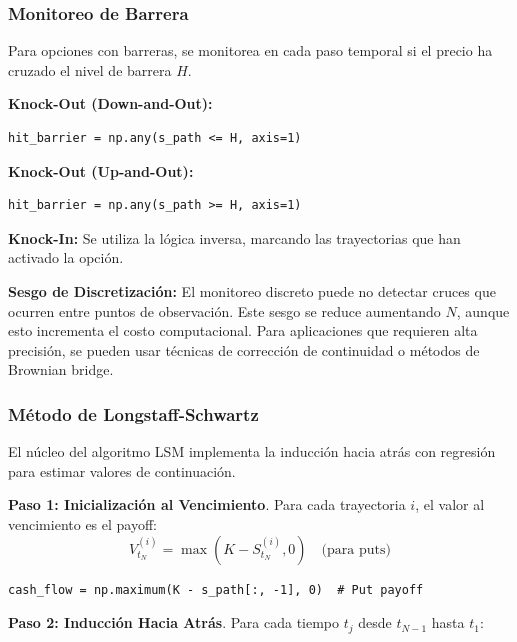 \subsubsection{Monitoreo de Barrera}

Para opciones con barreras, se monitorea en cada paso temporal si el precio ha cruzado el nivel de barrera $H$.

\textbf{Knock-Out (Down-and-Out):}
\begin{verbatim}
hit_barrier = np.any(s_path <= H, axis=1)
\end{verbatim}

\textbf{Knock-Out (Up-and-Out):}
\begin{verbatim}
hit_barrier = np.any(s_path >= H, axis=1)
\end{verbatim}

\textbf{Knock-In:} Se utiliza la lógica inversa, marcando las trayectorias que han activado la opción.

\textbf{Sesgo de Discretización:} El monitoreo discreto puede no detectar cruces que ocurren entre puntos de observación. Este sesgo se reduce aumentando $N$, aunque esto incrementa el costo computacional. Para aplicaciones que requieren alta precisión, se pueden usar técnicas de corrección de continuidad o métodos de Brownian bridge.

\subsubsection{Método de Longstaff-Schwartz}

El núcleo del algoritmo LSM implementa la inducción hacia atrás con regresión para estimar valores de continuación.

\textbf{Paso 1: Inicialización al Vencimiento}. Para cada trayectoria $i$, el valor al vencimiento es el payoff:
\begin{equation}
V_{t_N}^{(i)} = \max(K - S_{t_N}^{(i)}, 0) \quad \text{(para puts)}
\end{equation}

\begin{verbatim}
cash_flow = np.maximum(K - s_path[:, -1], 0)  # Put payoff
\end{verbatim}

\textbf{Paso 2: Inducción Hacia Atrás}. Para cada tiempo $t_j$ desde $t_{N-1}$ hasta $t_1$:

